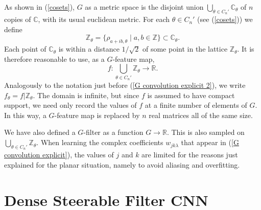\documentclass[journal]{IEEEtran}
\newcommand\reals{\mathbb{R}}
\newcommand\complexes{\mathbb{C}}
\newcommand\integers{\mathbb{Z}}
\newcommand\inG[2]{\rho_{#1,#2}}
\begin{document}
{	 As shown in (\ref{cosets}), $G$ as a metric space is the disjoint union $\bigcup_{\theta\in C_n'} \complexes_\theta$ of $n$ copies of $\complexes$, with its usual euclidean metric.
	 For each $\theta\in C_n'$ (see (\ref{cosets})) we define
	  \begin{equation}\label{lattice}
	      \integers_\theta = \{\inG{a+ib}\theta \mid a,b \in\integers\}
	      \subset \complexes_\theta.
	  \end{equation}
	  Each point of $\complexes_\theta$ is within a distance $1/\sqrt2$ of some point in the lattice $\integers_\theta$.
	  It is therefore reasonable to use, as a $G$-feature map,
	 \begin{equation}
	    f: \bigcup_{\theta\in C_n'} \integers_\theta\to \reals.
	 \end{equation}
	 Analogously to the notation just before (\ref{G convolution explicit 2}), we write 
	 $f_\theta = f| \integers_\theta$.
	 The domain is infinite, but since $f$ is assumed to have compact support, we need only record the values of $f$ at a finite number of elements of $G$. In this way, a $G$-feature map is replaced by $n$ real matrices all of the same size.
	 
	 We have also defined a $G$-filter as a function $G\to\reals$. This is also sampled on $\bigcup_{\theta\in C_n'} \integers_\theta$. When learning the complex coefficients $w_{jk\lambda}$ that appear in (\ref{G convolution explicit}), the values of $j$ and $k$ are limited for the reasons just explained for the planar situation, namely to avoid aliasing and overfitting.
	 }

	 \section{Dense Steerable Filter CNN} \label{dup1 section:methods}
\end{document}
